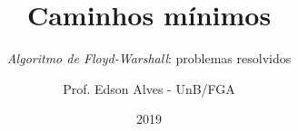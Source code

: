 \title{Caminhos mínimos}
\subtitle{\textit{Algoritmo de Floyd-Warshall}: problemas resolvidos}
\author{Prof. Edson Alves - UnB/FGA}
\date{2019}
